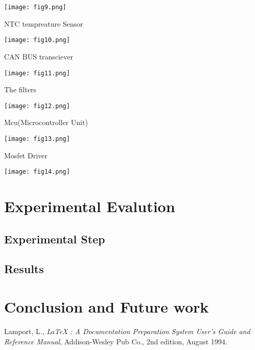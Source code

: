 \documentclass[11pt]{article}
\begin{document}
\begin {center}
\texttt{[image: fig9.png]}\newline
\end{center}

NTC tempreature Sensor
\begin {center}
\texttt{[image: fig10.png]}\newline
\end{center}

CAN BUS transciever
\begin {center}
\texttt{[image: fig11.png]}\newline
\end{center}

 The filters
\begin {center}
\texttt{[image: fig12.png]}\newline
\end{center}

Mcu(Microcontroller Unit)
\begin {center}
\texttt{[image: fig13.png]}\newline
\end{center}

Mosfet Driver
\begin {center}
\texttt{[image: fig14.png]}\newline
\end{center}

\section{Experimental Evalution}
\label{Experimental Evalution}



\subsection{Experimental Step}
\label{Experimental Step}

\subsection{Results}
\label{Results}


\section{Conclusion and Future work}
\label{Conclusion and Future work} 



\begin{thebibliography}{99}
 Lamport, L., {\it LaTeX : A Documentation
 Preparation System User's Guide and Reference Manual}, Addison-Wesley 
 Pub Co., 2nd edition, August 1994.
\end{thebibliography}
 
\end{document}
